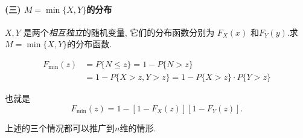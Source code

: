\paragraph{(三) $M=\min \{X, Y\}$的分布}

$X, Y$ 是两个\emph{相互独立}的随机变量, 它们的分布函数分别为 $F_X(x)$ 和$F_Y(y)$.求 $M=\min \{X, Y\}$的分布函数.


   $$
\begin{aligned}
F_{\min }(z) & =P\{N \leqslant z\}=1-P\{N>z\} \\
& =1-P\{X>z, Y>z\}=1-P\{X>z\} \cdot P\{Y>z\}
\end{aligned}
$$

也就是
$$
F_{\min }(z)=1-\left[1-F_X(z)\right]\left[1-F_Y(z)\right] .
$$

上述的三个情况都可以推广到$n$维的情形.
